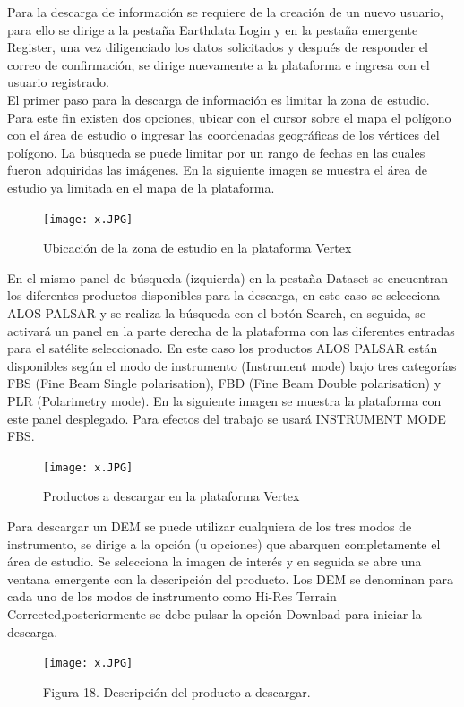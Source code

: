 \documentclass[12pt,hidelinks]{article}
\begin{document}
Para la descarga de información se requiere de la creación de un nuevo usuario, para ello se dirige a la pestaña Earthdata Login y en la pestaña emergente Register, una vez diligenciado los datos solicitados y después de responder el correo de confirmación, se dirige nuevamente a la plataforma e ingresa con el usuario registrado.\\[0.04 in]
El primer paso para la descarga de información es limitar la zona de estudio. Para este fin existen dos opciones, ubicar con el cursor sobre el mapa el polígono con el área de estudio o ingresar las coordenadas geográficas de los vértices del polígono. La búsqueda se puede limitar por un rango
de fechas en las cuales fueron adquiridas las imágenes. En la siguiente imagen se muestra el área de estudio ya limitada en el mapa de la plataforma.
\begin{figure}[H]
    \centering
    \texttt{[image: x.JPG]}
    \caption{Ubicación de la zona de estudio en la plataforma Vertex}
    \label{fig:my_label}
\end{figure}
En el mismo panel de búsqueda (izquierda) en la pestaña Dataset se encuentran los diferentes
productos disponibles para la descarga, en este caso se selecciona ALOS PALSAR y se realiza la búsqueda con el botón Search, en seguida, se activará un panel en la parte derecha de la plataforma con las diferentes entradas para el satélite seleccionado. En este caso los productos ALOS PALSAR
están disponibles según el modo de instrumento (Instrument mode) bajo tres categorías FBS (Fine Beam Single polarisation), FBD (Fine Beam Double polarisation) y PLR (Polarimetry mode). En la
siguiente imagen se muestra la plataforma con este panel desplegado. Para efectos del trabajo se usará INSTRUMENT MODE FBS.
\begin{figure}[H]
    \centering
    \texttt{[image: x.JPG]}
    \caption{Productos a descargar en la plataforma Vertex}
    \label{fig:my_label}
\end{figure}
Para descargar un DEM se puede utilizar cualquiera de los tres modos de instrumento, se dirige a la opción (u opciones) que abarquen completamente el área de estudio. Se selecciona la imagen de interés y en seguida se abre una ventana emergente con la descripción del producto. Los DEM se denominan para cada uno de los modos de instrumento como Hi-Res Terrain Corrected,posteriormente se debe pulsar la opción Download para iniciar la descarga.
\begin{figure}[H]
    \centering
    \texttt{[image: x.JPG]}
    \caption{Figura 18. Descripción del producto a descargar.}
    \label{fig:my_label}
\end{figure}
\end{document}
